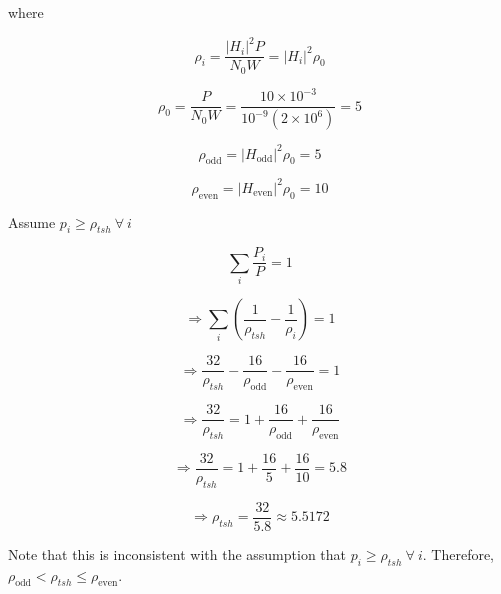 \documentclass[fleqn]{article}
\begin{document}
\begin{enumerate}
		where
		
		\begin{equation*}
			\rho_i = \frac{|H_i|^2P}{N_0W} = |H_i|^2\rho_0 
		\end{equation*}
		
		\begin{equation*}
			\rho_0 = \frac{P}{N_0W} = \frac{10 \times 10^{-3}}{10^{-9}(2 \times 10^6)} = 5
		\end{equation*}
		
		\begin{equation*}
			\rho_{\text{odd}} = |H_{\text{odd}}|^2\rho_0 = 5
		\end{equation*}
		
		\begin{equation*}
			\rho_{\text{even}} = |H_{\text{even}}|^2\rho_0 = 10
		\end{equation*}
		
		Assume $p_i \geq \rho_{tsh}\ \forall\ i$
		
		\begin{equation*}
			\sum_i{\frac{P_i}{P}} = 1
		\end{equation*}
		
		\begin{equation*}
			\Rightarrow \sum_i{\left(\frac{1}{\rho_{tsh}} - \frac{1}{\rho_i}\right)} = 1
		\end{equation*}
		
		\begin{equation*}
			\Rightarrow \frac{32}{\rho_{tsh}} - \frac{16}{\rho_{\text{odd}}} - \frac{16}{\rho_{\text{even}}} = 1
		\end{equation*}
		
		\begin{equation*}
			\Rightarrow \frac{32}{\rho_{tsh}} = 1 + \frac{16}{\rho_{\text{odd}}} + \frac{16}{\rho_{\text{even}}}
		\end{equation*}
		
		\begin{equation*}
			\Rightarrow \frac{32}{\rho_{tsh}} = 1 + \frac{16}{5} + \frac{16}{10} = 5.8
		\end{equation*}
		
		\begin{equation*}
			\Rightarrow \rho_{tsh} = \frac{32}{5.8} \approx 5.5172
		\end{equation*}
		
		Note that this is inconsistent with the assumption that $p_i \geq \rho_{tsh}\ \forall\ i$. Therefore, $\rho_{\text{odd}} < \rho_{tsh} \leq \rho_{\text{even}}$.
		

\end{enumerate}
\end{document}
